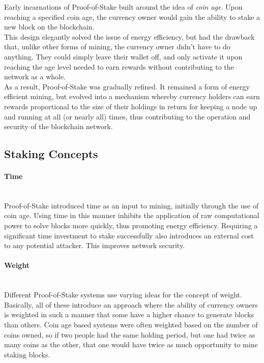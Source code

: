 \documentclass[11pt]{article}
\begin{document}
\noindent Early incarnations of Proof-of-Stake built around the idea of \textit{coin age}. Upon reaching a specified coin age, the currency owner would gain the ability to stake a new block on the blockchain.\\

\noindent This design elegantly solved the issue of energy efficiency, but had the drawback that, unlike other forms of mining, the currency owner didn't have to do anything. They could simply leave their wallet off, and only activate it upon reaching the age level needed to earn rewards without contributing to the network as a whole.\\

\noindent As a result, Proof-of-Stake was gradually refined. It remained a form of energy efficient mining, but evolved into a mechanism whereby currency holders can earn rewards proportional to the size of their holdings in return for keeping a node up and running at all (or nearly all) times, thus contributing to the operation and security of the blockchain network.\\

\subsection{Staking Concepts}

\paragraph{Time} ~\\
Proof-of-Stake introduced time as an input to mining, initially through the use of coin age. Using time in this manner inhibits the application of raw computational power to solve blocks more quickly, thus promoting energy efficiency. Requiring a significant time investment to stake successfully also introduces an external cost to any potential attacker. This improves network security. 

\paragraph{Weight} ~\\
Different Proof-of-Stake systems use varying ideas for the concept of weight. Basically, all of these introduce an approach where the ability of currency owners is weighted in such a manner that some have a higher chance to generate blocks than others. Coin age based systems were often weighted based on the number of coins owned, so if two people had the same holding period, but one had twice as many coins as the other, that one would have twice as much opportunity to mine staking blocks.
\end{document}
